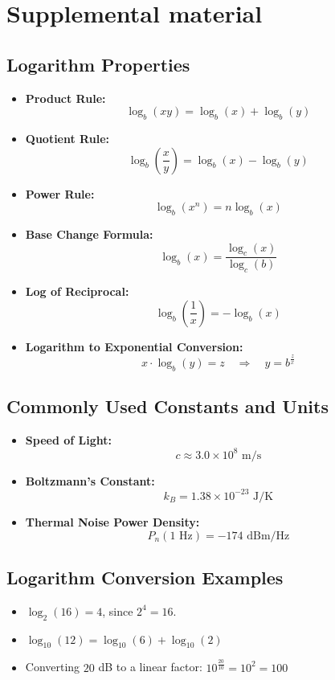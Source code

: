 \documentclass[12pt]{article}
\begin{document}
\section{Supplemental material}
\subsection{Logarithm Properties}
\begin{itemize}
    \item \textbf{Product Rule:} 
    \[
    \log_b (xy) = \log_b (x) + \log_b (y)
    \]
    \item \textbf{Quotient Rule:} 
    \[
    \log_b \left( \frac{x}{y} \right) = \log_b (x) - \log_b (y)
    \]
    \item \textbf{Power Rule:} 
    \[
    \log_b (x^n) = n \log_b (x)
    \]
    \item \textbf{Base Change Formula:} 
    \[
    \log_b (x) = \frac{\log_c (x)}{\log_c (b)}
    \]
    \item \textbf{Log of Reciprocal:} 
    \[
    \log_b \left( \frac{1}{x} \right) = -\log_b (x)
    \]
    \item \textbf{Logarithm to Exponential Conversion:}
    \[
    x \cdot \log_b(y) = z \quad \Rightarrow \quad y = b^{\frac{z}{x}}
    \]
\end{itemize}
\subsection{Commonly Used Constants and Units}

\begin{itemize}
    \item \textbf{Speed of Light:} 
    \[
    c \approx 3.0 \times 10^8 \text{ m/s}
    \]
    \item \textbf{Boltzmann's Constant:} 
    \[
    k_B = 1.38 \times 10^{-23} \text{ J/K}
    \]
        \item \textbf{Thermal Noise Power Density:}  
    \[
    P_n (1 \text{ Hz}) = -174 \text{ dBm/Hz}
    \]
    
\end{itemize}

\subsection{Logarithm Conversion Examples}
\begin{itemize}
    \item \(\log_{2} (16) = 4\), since \(2^4 = 16\).
    \item \(\log_{10}(12) = \log_{10}(6)+\log_{10}(2)\)
    \item Converting \( 20 \) dB to a linear factor: \(10^{\frac{20}{10}} = 10^{2} = 100\)

\end{itemize}
\end{document}
